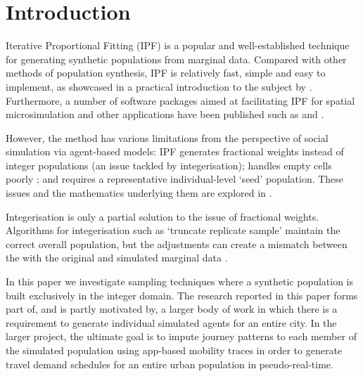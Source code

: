 \documentclass{JASSS}
\begin{document}



\section{Introduction}\label{introduction}

Iterative Proportional Fitting (IPF) is a popular and well-established
technique for generating synthetic populations from marginal data.
Compared with other methods of population synthesis, IPF is relatively
fast, simple and easy to implement, as showcased in a practical
introduction to the subject by \cite{lovelace_spatial_2016}. Furthermore,
a number of software packages aimed at facilitating IPF for spatial
microsimulation and other applications have been published
such as \cite{barthelemy_cran_2016} and \cite{jones_raker:_2016}.

However, the method has various limitations from the perspective of
social simulation via agent-based models: IPF
generates fractional weights instead of integer populations
(an issue tackled by integerisation);
handles empty cells poorly \citep{lovelace_evaluating_2015};
and requires a representative individual-level `seed' population.
These issues and the mathematics underlying them are explored
in \cite{zaloznik_iterative_2011}.

Integerisation is only a partial solution to the issue of fractional weights.
Algorithms for integerisation such as `truncate replicate sample'
maintain the correct overall population,
but the adjustments can create a mismatch between the with the original
and simulated marginal data \citep{lovelace_truncate_2013}.

In this paper we investigate sampling techniques where a synthetic population is built exclusively in the integer domain. The research reported in this paper forms part of, and is partly motivated by, a larger body of work in which there is a requirement to generate individual simulated agents for an entire city. In the larger project, the ultimate goal is to impute journey patterns to each member of the simulated population using app-based mobility traces in order to generate travel demand schedules for an entire urban population in pseudo-real-time.
\end{document}
